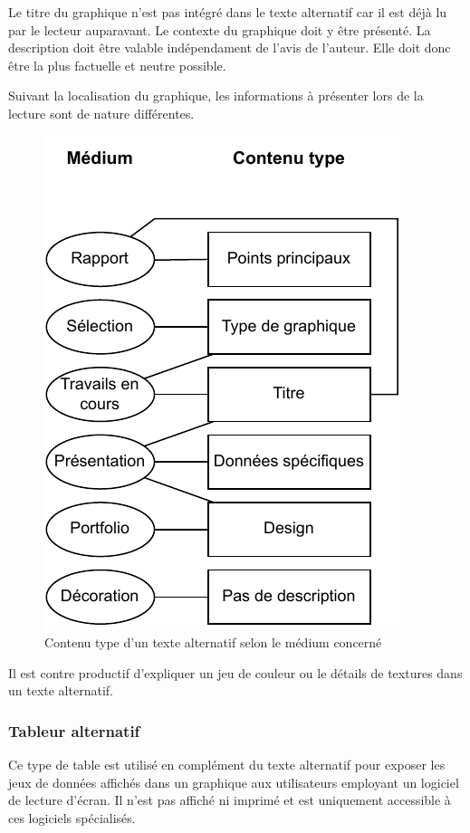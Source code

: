 \documentclass[a4paper,12pt]{article}
\begin{document}
\begin{multicols}{2}
Le titre du graphique n'est pas intégré dans le texte alternatif car il est déjà lu par le lecteur auparavant.
Le contexte du graphique doit y être présenté. La description doit être valable indépendament de l'avis de l'auteur. Elle doit donc être la plus factuelle et neutre possible.

Suivant la localisation du graphique, les informations à présenter lors de la lecture sont de nature différentes. \autocite{frankelavskyRightToolsJob2022}
\begin{figure}[H]
\centering
\includegraphics[width=.9\linewidth]{./img/alt-text.pdf}
\caption{\label{fig:org05d4331}Contenu type d'un texte alternatif selon le médium concerné}
\end{figure}

Il est contre productif d'expliquer un jeu de couleur ou le détails de textures dans un texte alternatif. \autocite{elizabethhareWritingAltText2022}
\subsubsection*{Tableur alternatif}
\label{sec:orgf989185}
Ce type de table est utilisé en complément du texte alternatif pour exposer les jeux de données affichés dans un graphique aux utilisateurs employant un logiciel de lecture d'écran. Il n'est pas affiché ni imprimé et est uniquement accessible à ces logiciels spécialisés.


\end{multicols}
\end{document}
